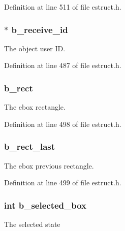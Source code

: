 Definition at line 511 of file estruct.\-h.

\hypertarget{struct__edspbox_a3fb2b6968877ffd009753ccc0fe96769}{
\subsubsection[{b\-\_\-receive\-\_\-id}]{$\ast$ b\-\_\-receive\-\_\-id}}\label{struct__edspbox_a3fb2b6968877ffd009753ccc0fe96769}
The object user I\-D. 

Definition at line 487 of file estruct.\-h.

\hypertarget{struct__edspbox_abc70ff46c135ee9f377a038bbc05a33e}{
\subsubsection[{b\-\_\-rect}]{ b\-\_\-rect}}\label{struct__edspbox_abc70ff46c135ee9f377a038bbc05a33e}
The ebox rectangle. 

Definition at line 498 of file estruct.\-h.

\hypertarget{struct__edspbox_a2a0a15d3bc005cd4f815088b230b5ebd}{
\subsubsection[{b\-\_\-rect\-\_\-last}]{ b\-\_\-rect\-\_\-last}}\label{struct__edspbox_a2a0a15d3bc005cd4f815088b230b5ebd}
The ebox previous rectangle. 

Definition at line 499 of file estruct.\-h.

\hypertarget{struct__edspbox_acc1a127070b19ccf6e222d7349c84c96}{
\subsubsection[{b\-\_\-selected\-\_\-box}]{\setlength{\rightskip}{0pt plus 5cm}int b\-\_\-selected\-\_\-box}}\label{struct__edspbox_acc1a127070b19ccf6e222d7349c84c96}
The selected state 

